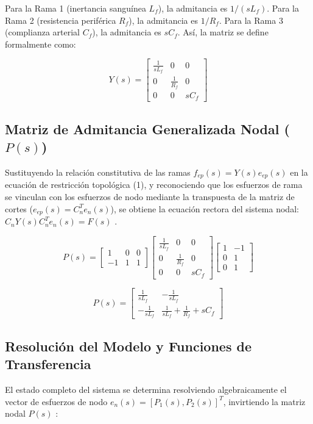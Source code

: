 \documentclass[journal,10pt]{IEEEtran}
\begin{document}
Para la Rama 1 (inertancia sanguínea $L_f$), la admitancia es $1/(sL_f)$. Para la Rama 2 (resistencia periférica $R_f$), la admitancia es $1/R_f$. Para la Rama 3 (complianza arterial $C_f$), la admitancia es $sC_f$. Así, la matriz se define formalmente como:

\begin{equation}
Y(s) = \begin{bmatrix}
\frac{1}{sL_f} & 0 & 0 \\
0 & \frac{1}{R_f} & 0 \\
0 & 0 & sC_f
\end{bmatrix}
\end{equation}

\subsection{Matriz de Admitancia Generalizada Nodal ($P(s)$)}
Sustituyendo la relación constitutiva de las ramas $f_{ep}(s) = Y(s)e_{ep}(s)$ en la ecuación de restricción topológica (1), y reconociendo que los esfuerzos de rama se vinculan con los esfuerzos de nodo mediante la transpuesta de la matriz de cortes ($e_{ep}(s) = C_n^T e_n(s)$), se obtiene la ecuación rectora del sistema nodal: $C_n Y(s) C_n^T e_n(s) = F(s)$ \cite{wellstead1979}. 


\begin{equation}
P(s) = \begin{bmatrix}
1 & 0 & 0 \\
-1 & 1 & 1
\end{bmatrix}
\begin{bmatrix}
\frac{1}{sL_f} & 0 & 0 \\
0 & \frac{1}{R_f} & 0 \\
0 & 0 & sC_f
\end{bmatrix}
\begin{bmatrix}
1 & -1 \\
0 & 1 \\
0 & 1
\end{bmatrix}
\end{equation}

\begin{equation}
P(s) = \begin{bmatrix}
\frac{1}{sL_f} & -\frac{1}{sL_f} \\
-\frac{1}{sL_f} & \frac{1}{sL_f} + \frac{1}{R_f} + sC_f
\end{bmatrix}
\end{equation}


\subsection{Resolución del Modelo y Funciones de Transferencia}
El estado completo del sistema se determina resolviendo algebraicamente el vector de esfuerzos de nodo $e_n(s) = [P_1(s), P_2(s)]^T$, invirtiendo la matriz nodal $P(s)$ \cite{wellstead1979}:
\end{document}
